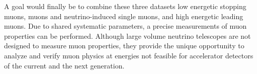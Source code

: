 A goal would finally be to combine these three datasets low energetic stopping muons, muons and neutrino-induced single muons, and high energetic leading muons.
Due to shared systematic parameters, a precise measurements of muon properties can be performed.
Although large volume neutrino telescopes are not designed to measure muon properties, they provide the unique opportunity to analyze and verify muon physics at energies not feasible for accelerator detectors of the current and the next generation.
